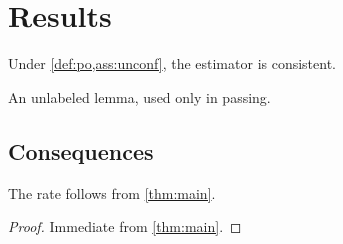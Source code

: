 \section{Results}

\begin{thm}[Consistency]\label{thm:main}
Under \cref{def:po,ass:unconf}, the estimator is consistent.
\end{thm}

\begin{lem}
An unlabeled lemma, used only in passing.
\end{lem}

\subsection{Consequences}

\begin{cor}\label{cor:rate}
The rate follows from \ref{thm:main}.
\end{cor}
\begin{proof}
Immediate from \cref{thm:main}.
\end{proof}
